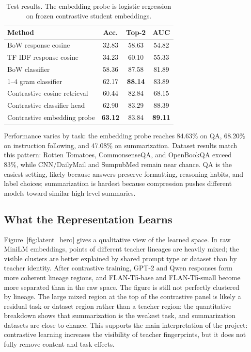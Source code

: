 \documentclass[11pt]{article}
\begin{document}
\begin{table}[t]
\centering
\small
\begin{tabular}{lccc}
\toprule
Method & Acc. & Top-2 & AUC \\
\midrule
BoW response cosine & 32.83 & 58.63 & 54.82 \\
TF-IDF response cosine & 34.23 & 60.10 & 55.33 \\
BoW classifier & 58.36 & 87.58 & 81.89 \\
1--4 gram classifier & 62.17 & \textbf{88.14} & 83.89 \\
\midrule
Contrastive cosine retrieval & 60.44 & 82.84 & 68.15 \\
Contrastive classifier head & 62.90 & 83.29 & 88.39 \\
Contrastive embedding probe & \textbf{63.12} & 83.84 & \textbf{89.11} \\
\bottomrule
\end{tabular}
\caption{Test results. The embedding probe is logistic regression on frozen contrastive student embeddings.}
\label{tab:main}
\end{table}

Performance varies by task: the embedding probe reaches 84.63\% on QA, 68.20\% on instruction following, and 47.08\% on summarization.
Dataset results match this pattern: Rotten Tomatoes, CommonsenseQA, and OpenBookQA exceed 83\%, while CNN/DailyMail and SumpubMed remain near chance.
QA is the easiest setting, likely because answers preserve formatting, reasoning habits, and label choices; summarization is hardest because compression pushes different models toward similar high-level summaries.

\subsection{What the Representation Learns}

Figure~\ref{fig:latent_hero} gives a qualitative view of the learned space.
In raw MiniLM embeddings, points of different teacher lineages are heavily mixed; the visible clusters are better explained by shared prompt type or dataset than by teacher identity.
After contrastive training, GPT-2 and Qwen responses form more coherent lineage regions, and FLAN-T5-base and FLAN-T5-small become more separated than in the raw space.
The figure is still not perfectly clustered by lineage.
The large mixed region at the top of the contrastive panel is likely a residual task or dataset region rather than a teacher region: the quantitative breakdown shows that summarization is the weakest task, and summarization datasets are close to chance.
This supports the main interpretation of the project: contrastive learning increases the visibility of teacher fingerprints, but it does not fully remove content and task effects.
\end{document}
